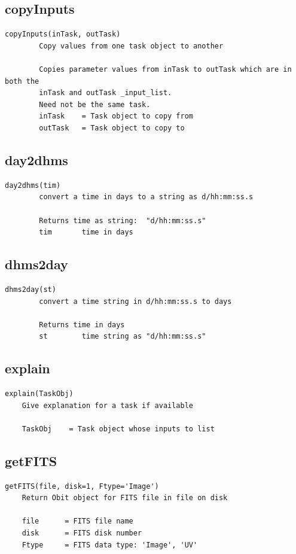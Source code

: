 \documentclass[11pt]{report}
\begin{document}
\subsection{copyInputs}
\begin{verbatim}
copyInputs(inTask, outTask)
        Copy values from one task object to another
        
        Copies parameter values from inTask to outTask which are in both the
        inTask and outTask _input_list.
        Need not be the same task.
        inTask    = Task object to copy from
        outTask   = Task object to copy to
\end{verbatim}

\subsection{day2dhms}
\begin{verbatim}
day2dhms(tim)
        convert a time in days to a string as d/hh:mm:ss.s
        
        Returns time as string:  "d/hh:mm:ss.s"
        tim       time in days
\end{verbatim}

\subsection{dhms2day}
\begin{verbatim}
dhms2day(st)
        convert a time string in d/hh:mm:ss.s to days
        
        Returns time in days
        st        time string as "d/hh:mm:ss.s"
\end{verbatim}
    
\subsection{explain}
\begin{verbatim}
explain(TaskObj)
    Give explanation for a task if available
    
    TaskObj    = Task object whose inputs to list
\end{verbatim}

\subsection{getFITS}
\begin{verbatim}
getFITS(file, disk=1, Ftype='Image')
    Return Obit object for FITS file in file on disk
    
    file      = FITS file name
    disk      = FITS disk number
    Ftype     = FITS data type: 'Image', 'UV'
\end{verbatim}
\end{document}
